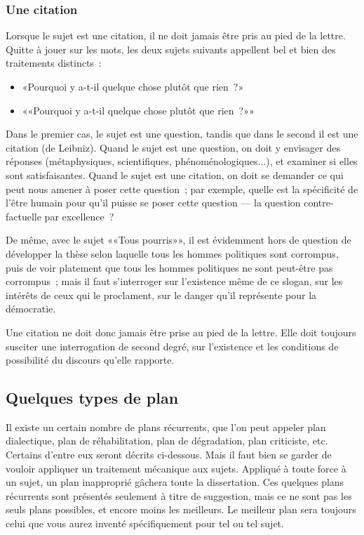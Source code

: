 \documentclass[a4paper,11pt]{article}
\begin{document}
\subsubsection{Une citation}

Lorsque le sujet est une citation, il ne doit jamais être pris au pied
de la lettre. Quitte à jouer sur les mots, les deux sujets suivants
appellent bel et bien des traitements distincts~:
\begin{itemize}
\item «Pourquoi y a-t-il quelque chose plutôt que rien~?»
\item ««Pourquoi y a-t-il quelque chose plutôt que rien~?»»
\end{itemize}
Dans le premier cas, le sujet est une question, tandis que dans le
second il est une citation (de Leibniz). Quand le sujet est une
question, on doit y envisager des réponses (métaphysiques,
scientifiques, phénoménologiques...), et examiner si elles sont
satisfaisantes. Quand le sujet est une citation, on doit se demander ce
qui peut nous amener à poser cette question~; par exemple, quelle est la
spécificité de l'être humain pour qu'il puisse se poser cette question
--- la question contre-factuelle par excellence~?

\par

De même, avec le sujet ««Tous pourris»», il est évidemment hors de
question de développer la thèse selon laquelle tous les hommes
politiques sont corrompus, puis de voir platement que tous les hommes
politiques ne sont peut-être pas corrompus~; mais il faut s'interroger
sur l'existence même de ce slogan, sur les intérêts de ceux qui le
proclament, sur le danger qu'il représente pour la démocratie.

\par

Une citation ne doit donc jamais être prise au pied de la lettre. Elle
doit toujours susciter une interrogation de second degré, sur
l'existence et les conditions de possibilité du discours qu'elle
rapporte.



\subsection{Quelques types de plan}

Il existe un certain nombre de plans récurrents, que l'on peut appeler
plan dialectique, plan de réhabilitation, plan de dégradation, plan
criticiste, etc. Certains d'entre eux seront décrits ci-dessous. Mais il
faut bien se garder de vouloir appliquer un traitement mécanique aux
sujets. Appliqué à toute force à un sujet, un plan inapproprié gâchera
toute la dissertation. Ces quelques plans récurrents sont présentés
seulement à titre de suggestion, mais ce ne sont pas les seuls plans
possibles, et encore moins les meilleurs. Le meilleur plan sera toujours
celui que vous aurez inventé spécifiquement pour tel ou tel sujet.
\end{document}
